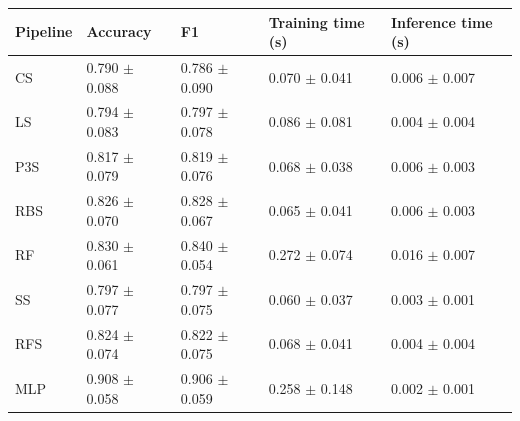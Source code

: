\begin{tabular}{lllll}
\toprule
Pipeline & Accuracy & F1 & Training time (s) & Inference time (s) \\
\midrule
CS & 0.790 $\pm$ 0.088 & 0.786 $\pm$ 0.090 & 0.070 $\pm$ 0.041 & 0.006 $\pm$ 0.007 \\
LS & 0.794 $\pm$ 0.083 & 0.797 $\pm$ 0.078 & 0.086 $\pm$ 0.081 & 0.004 $\pm$ 0.004 \\
P3S & 0.817 $\pm$ 0.079 & 0.819 $\pm$ 0.076 & 0.068 $\pm$ 0.038 & 0.006 $\pm$ 0.003 \\
RBS & 0.826 $\pm$ 0.070 & 0.828 $\pm$ 0.067 & 0.065 $\pm$ 0.041 & 0.006 $\pm$ 0.003 \\
RF & 0.830 $\pm$ 0.061 & 0.840 $\pm$ 0.054 & 0.272 $\pm$ 0.074 & 0.016 $\pm$ 0.007 \\
SS & 0.797 $\pm$ 0.077 & 0.797 $\pm$ 0.075 & 0.060 $\pm$ 0.037 & 0.003 $\pm$ 0.001 \\
RFS & 0.824 $\pm$ 0.074 & 0.822 $\pm$ 0.075 & 0.068 $\pm$ 0.041 & 0.004 $\pm$ 0.004 \\
MLP & 0.908 $\pm$ 0.058 & 0.906 $\pm$ 0.059 & 0.258 $\pm$ 0.148 & 0.002 $\pm$ 0.001 \\
\bottomrule
\end{tabular}
